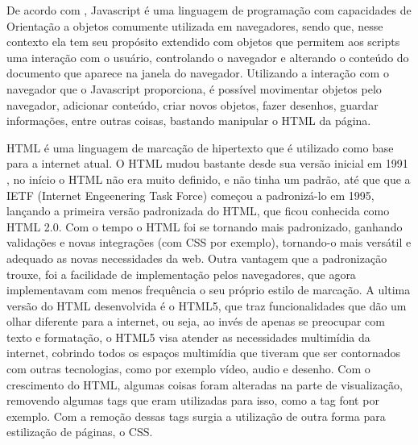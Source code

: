 De acordo com \cite{flanagan2006javascript}, Javascript é uma linguagem de programação
com capacidades de Orientação a objetos comumente utilizada em
navegadores, sendo que, nesse contexto ela tem seu propósito extendido com objetos que permitem
aos scripts uma interação com o usuário, controlando o navegador e alterando o conteúdo
do documento que aparece na janela do navegador.
Utilizando a interação com o navegador que o Javascript proporciona, é possível movimentar
objetos pelo navegador, adicionar conteúdo, criar novos objetos, fazer desenhos, guardar
informações, entre outras coisas, bastando manipular o HTML da página.

HTML é uma linguagem de marcação de hipertexto que é utilizado como base para a internet
atual. O HTML mudou bastante desde sua versão inicial em 1991
\cite{powell2003html}, no início o HTML não era muito definido, e não tinha um padrão, até que que a
IETF (Internet Engeenering Task Force) começou a padronizá-lo em 1995, lançando a
primeira versão padronizada do HTML, que ficou conhecida como HTML 2.0.
Com o tempo o HTML foi se tornando mais padronizado, ganhando validações e novas integrações
(com CSS por exemplo), tornando-o mais versátil e adequado as novas necessidades da
web. Outra vantagem que a padronização trouxe, foi a facilidade de implementação pelos
navegadores, que agora implementavam com menos frequência o seu próprio estilo de marcação.
A ultima versão do HTML desenvolvida é o HTML5, que traz funcionalidades que dão um
olhar diferente para a internet, ou seja, ao invés de apenas se preocupar com texto
e formatação, o HTML5 visa atender as necessidades multimídia da internet, cobrindo
todos os espaços multimídia que tiveram que ser contornados com outras tecnologias,
como por exemplo vídeo, audio e desenho.
Com o crescimento do HTML, algumas coisas foram alteradas na parte de visualização,
removendo algumas tags que eram utilizadas para isso, como a tag font por exemplo.
Com a remoção dessas tags surgia a utilização de outra forma para
estilização de páginas, o CSS.

